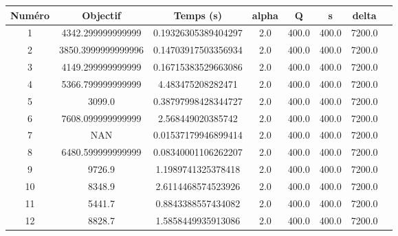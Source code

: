 \begin{tabular}{|c|c|c|c|c|c|c|c|}
\hline
 Numéro & Objectif & Temps (s) & alpha & Q & s & delta \\
\hline
1 & 4342.299999999999 & 0.19326305389404297 & 2.0 & 400.0 & 400.0 & 7200.0 \\ 
 \hline
2 & 3850.3999999999996 & 0.14703917503356934 & 2.0 & 400.0 & 400.0 & 7200.0 \\ 
 \hline
3 & 4149.299999999999 & 0.16715383529663086 & 2.0 & 400.0 & 400.0 & 7200.0 \\ 
 \hline
4 & 5366.799999999999 & 4.483475208282471 & 2.0 & 400.0 & 400.0 & 7200.0 \\ 
 \hline
5 & 3099.0 & 0.38797998428344727 & 2.0 & 400.0 & 400.0 & 7200.0 \\ 
 \hline
6 & 7608.099999999999 & 2.568449020385742 & 2.0 & 400.0 & 400.0 & 7200.0 \\ 
 \hline
7 & NAN & 0.01537179946899414 & 2.0 & 400.0 & 400.0 & 7200.0 \\ 
 \hline
8 & 6480.599999999999 & 0.08340001106262207 & 2.0 & 400.0 & 400.0 & 7200.0 \\ 
 \hline
9 & 9726.9 & 1.1989741325378418 & 2.0 & 400.0 & 400.0 & 7200.0 \\ 
 \hline
10 & 8348.9 & 2.6114468574523926 & 2.0 & 400.0 & 400.0 & 7200.0 \\ 
 \hline
11 & 5441.7 & 0.8843388557434082 & 2.0 & 400.0 & 400.0 & 7200.0 \\ 
 \hline
12 & 8828.7 & 1.5858449935913086 & 2.0 & 400.0 & 400.0 & 7200.0 \\ 
 \hline
\end{tabular}
